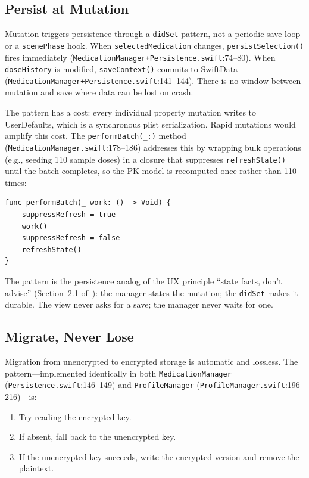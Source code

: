 \documentclass[11pt,a4paper]{article}
\newcommand{\code}[1]{\texttt{\small #1}}
\begin{document}
\subsection{Persist at Mutation}
\label{sec:persist_at_mutation}

Mutation triggers persistence through a \code{didSet} pattern, not a
periodic save loop or a \code{scenePhase} hook. When
\code{selectedMedication} changes, \code{persistSelection()} fires
immediately (\code{MedicationManager+Persistence.swift}:74--80). When
\code{doseHistory} is modified, \code{saveContext()} commits to SwiftData
(\code{MedicationManager+Persistence.swift}:141--144). There is no window
between mutation and save where data can be lost on crash.

The pattern has a cost: every individual property mutation writes to
UserDefaults, which is a synchronous plist serialization. Rapid mutations
would amplify this cost. The \code{performBatch(\_:)} method
(\code{MedicationManager.swift}:178--186) addresses this by wrapping bulk
operations (e.g., seeding 110 sample doses) in a closure that suppresses
\code{refreshState()} until the batch completes, so the PK model is
recomputed once rather than 110 times:

\begin{verbatim}
func performBatch(_ work: () -> Void) {
    suppressRefresh = true
    work()
    suppressRefresh = false
    refreshState()
}
\end{verbatim}

The pattern is the persistence analog of the UX principle ``state facts,
don't advise'' (Section~2.1 of~\cite{xtux}): the manager states the mutation;
the \code{didSet} makes it durable. The view never asks for a save; the
manager never waits for one.

\subsection{Migrate, Never Lose}
\label{sec:migrate_never_lose}

Migration from unencrypted to encrypted storage is automatic and lossless.
The pattern---implemented identically in both \code{MedicationManager}
(\code{Persistence.swift}:146--149) and \code{ProfileManager}
(\code{ProfileManager.swift}:196--216)---is:

\begin{enumerate}[nosep,leftmargin=1.4em]
\item Try reading the encrypted key.
\item If absent, fall back to the unencrypted key.
\item If the unencrypted key succeeds, write the encrypted version and remove
  the plaintext.
\end{enumerate}
\end{document}
